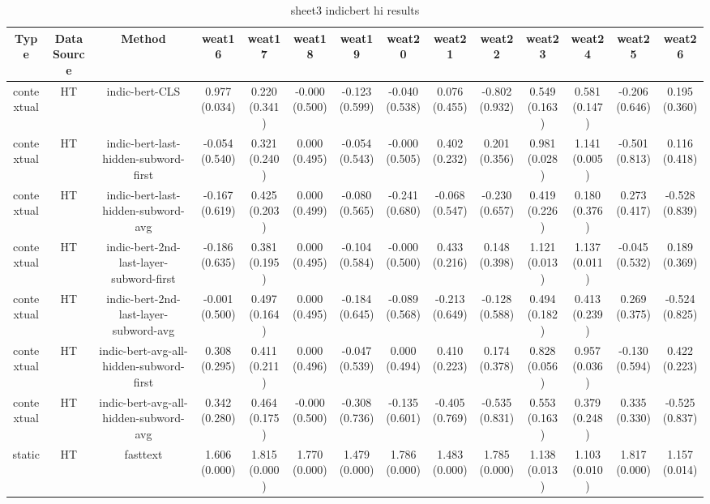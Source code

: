 \begin{sidewaystable}[htb]
    \centering
    \caption{sheet3 indicbert hi results}
    \label{appendix_tab:sheet3_indicbert_hi_results}
    \small
    \begin{tabular}{@{}cccccccccccccc@{}}
        \toprule
        Type & DataSource & Method & weat16 & weat17 & weat18 & weat19 & weat20 & weat21 & weat22 & weat23 & weat24 & weat25 & weat26 \\
        \midrule
        contextual & HT & indic-bert-CLS & 0.977 (0.034) & 0.220 (0.341) & -0.000 (0.500) & -0.123 (0.599) & -0.040 (0.538) & 0.076 (0.455) & -0.802 (0.932) & 0.549 (0.163) & 0.581 (0.147) & -0.206 (0.646) & 0.195 (0.360) \\
        contextual & HT & indic-bert-last-hidden-subword-first & -0.054 (0.540) & 0.321 (0.240) & 0.000 (0.495) & -0.054 (0.543) & -0.000 (0.505) & 0.402 (0.232) & 0.201 (0.356) & 0.981 (0.028) & 1.141 (0.005) & -0.501 (0.813) & 0.116 (0.418) \\
        contextual & HT & indic-bert-last-hidden-subword-avg & -0.167 (0.619) & 0.425 (0.203) & 0.000 (0.499) & -0.080 (0.565) & -0.241 (0.680) & -0.068 (0.547) & -0.230 (0.657) & 0.419 (0.226) & 0.180 (0.376) & 0.273 (0.417) & -0.528 (0.839) \\
        contextual & HT & indic-bert-2nd-last-layer-subword-first & -0.186 (0.635) & 0.381 (0.195) & 0.000 (0.495) & -0.104 (0.584) & -0.000 (0.500) & 0.433 (0.216) & 0.148 (0.398) & 1.121 (0.013) & 1.137 (0.011) & -0.045 (0.532) & 0.189 (0.369) \\
        contextual & HT & indic-bert-2nd-last-layer-subword-avg & -0.001 (0.500) & 0.497 (0.164) & 0.000 (0.495) & -0.184 (0.645) & -0.089 (0.568) & -0.213 (0.649) & -0.128 (0.588) & 0.494 (0.182) & 0.413 (0.239) & 0.269 (0.375) & -0.524 (0.825) \\
        contextual & HT & indic-bert-avg-all-hidden-subword-first & 0.308 (0.295) & 0.411 (0.211) & 0.000 (0.496) & -0.047 (0.539) & 0.000 (0.494) & 0.410 (0.223) & 0.174 (0.378) & 0.828 (0.056) & 0.957 (0.036) & -0.130 (0.594) & 0.422 (0.223) \\
        contextual & HT & indic-bert-avg-all-hidden-subword-avg & 0.342 (0.280) & 0.464 (0.175) & -0.000 (0.500) & -0.308 (0.736) & -0.135 (0.601) & -0.405 (0.769) & -0.535 (0.831) & 0.553 (0.163) & 0.379 (0.248) & 0.335 (0.330) & -0.525 (0.837) \\
        static & HT & fasttext & 1.606 (0.000) & 1.815 (0.000) & 1.770 (0.000) & 1.479 (0.000) & 1.786 (0.000) & 1.483 (0.000) & 1.785 (0.000) & 1.138 (0.013) & 1.103 (0.010) & 1.817 (0.000) & 1.157 (0.014) \\

\end{tabular}
\end{sidewaystable}
